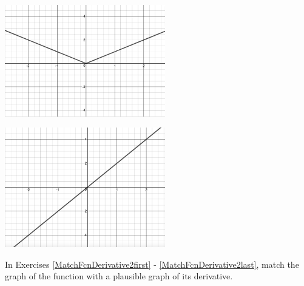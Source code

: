 \documentclass{ximera}
\begin{document}
\begin{center}
\begin{multicols}{2}
\includegraphics[width=2.75in]{./IntroductiontoDerivativesGraphics/MatchFunc03.jpeg}

\includegraphics[width=2.75in]{./IntroductiontoDerivativesGraphics/MatchDeriv02.jpeg}

\end{multicols}


\end{center}

In Exercises \ref{MatchFcnDerivative2first} - \ref{MatchFcnDerivative2last}, match the graph of the function with a plausible graph of its derivative.
\end{document}
